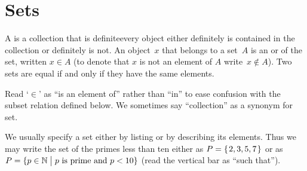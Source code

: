 \documentclass{ibl}  %
\begin{document}
\begin{problem}[\midlength]
\end{problem}










\chapter{Sets}
\begin{df}
A  is a collection that is definite\Dash every 
object either
definitely is contained in the collection or definitely is not.
An object~$x$ that belongs to a set~$A$ is an 
or 
of the set, written $x\in A$
(to denote that $x$ is not an element of $A$ write~$x\notin A$).
Two sets are equal if and only if they have the same elements.
\end{df}
\noindent Read `$\in$' as ``is an element of'' rather than ``in'' to ease
confusion with 
the subset relation defined below.
We sometimes say ``collection'' as a synonym for set.

We usually specify a set either by listing or by
describing its elements.
Thus we may write 
the set of the primes less than ten either 
as $P=\mbox{$\{\hspace{0.1em}2, 3, 5, 7\hspace{0.1em}\}$}$ 
or as~$P=\{p\in\mathbb{N} \bigm| \text{$p$ is prime and $p<10$}\}$ 
(read the vertical bar as ``such that'').
\end{document}
